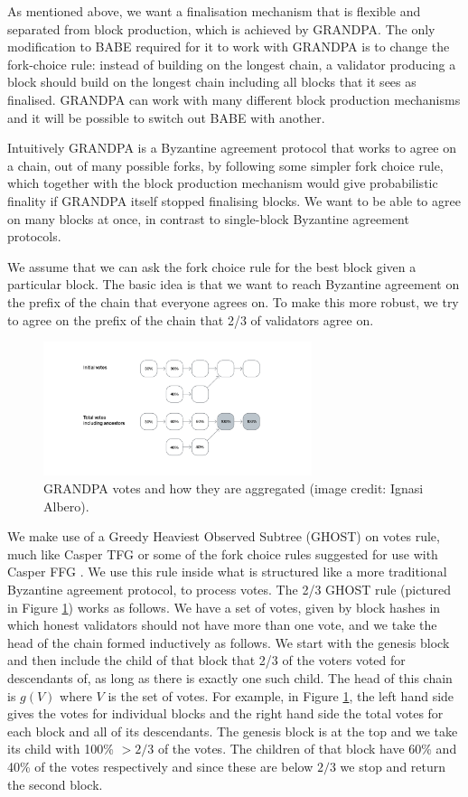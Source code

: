 \documentclass{article}
\begin{document}
As mentioned above, we want a finalisation mechanism that is flexible and separated from block production, which is achieved by GRANDPA. The only modification to BABE required for it to work with GRANDPA is to change the fork-choice rule: instead of building on the longest chain, a validator producing a block should build on the longest chain including all blocks that it sees as finalised. GRANDPA can work with many different block production mechanisms and it will be possible to switch out BABE with another.

Intuitively GRANDPA is a Byzantine agreement protocol that works to agree on a chain, out of many possible forks, by following some simpler fork choice rule, which together with the block production mechanism would give probabilistic finality if GRANDPA itself stopped finalising blocks. We want to be able to agree on many blocks at once, in contrast to single-block Byzantine agreement protocols.

We assume that we can ask the fork choice rule for the best block given a particular block. The basic idea is that we want to reach Byzantine agreement on the prefix of the chain that everyone agrees on. To make this more robust, we try to agree on the prefix of the chain that 2/3 of validators agree on.

\begin{figure}[h!]
	\centering
	\includegraphics[width=0.7\textwidth]{Grandpa.png}
	\caption{GRANDPA votes and how they are aggregated (image credit: Ignasi Albero).}
	\label{fig:grandpa}
\end{figure}

We make use of a Greedy Heaviest Observed Subtree (GHOST) on votes rule, much like Casper TFG \cite{CasperTFG} or some of the fork choice rules suggested for use with Casper FFG \cite{CasperFFG}. We use this rule inside what is structured like a more traditional Byzantine agreement protocol, to process votes. The 2/3 GHOST rule (pictured in Figure \ref{fig:grandpa})  works as follows. We have a set of votes, given by block hashes in which honest validators should not have more than one vote, and we take the head of the chain formed inductively as follows. We start with the genesis block and then include the child of that block that 2/3 of the voters voted for descendants of, as long as there is exactly one such child. The head of this chain is $g(V)$ where $V$ is the set of votes. For example, in Figure \ref{fig:grandpa}, the left hand side gives the votes for individual blocks and the right hand side the total votes for each block and all of its descendants. The genesis block is at the top and we take its child with 100\% $> 2/3$ of the votes. The children of that block have 60\% and 40\% of the votes respectively and since these are below $2/3$ we stop and return the second block.
\end{document}
